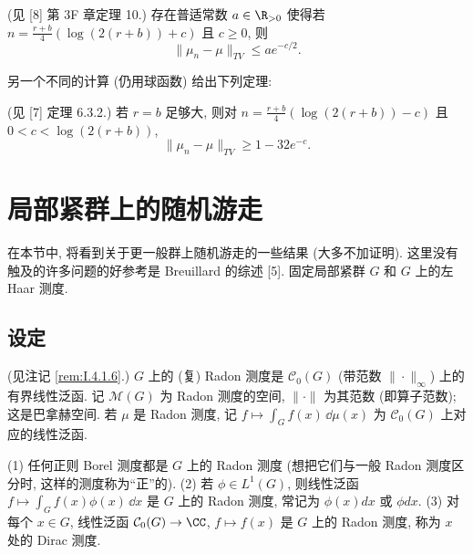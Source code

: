 \begin{theorem}
\label{thm:VI.5.1}
(见 {[}8{]} 第 3F 章定理 10.) 存在普适常数 $a \in \R_{>0}$ 使得若 $n = \frac{r+b}{4}(\log(2(r+b)) + c)$ 且 $c \geq 0$, 则
\[
\|\mu_n - \mu\|_{TV} \leq ae^{-c/2}.
\]
\end{theorem}

另一个不同的计算 (仍用球函数) 给出下列定理:

\begin{theorem}
\label{thm:VI.5.2}
(见 {[}7{]} 定理 6.3.2.) 若 $r = b$ 足够大, 则对 $n = \frac{r+b}{4}(\log(2(r+b)) - c)$ 且 $0 < c < \log(2(r+b))$,
\[
\|\mu_n - \mu\|_{TV} \geq 1 - 32e^{-c}.
\]
\end{theorem}

\section{局部紧群上的随机游走}
在本节中, 将看到关于更一般群上随机游走的一些结果 (大多不加证明). 这里没有触及的许多问题的好参考是 Breuillard 的综述 {[}5{]}.
固定局部紧群 $G$ 和 $G$ 上的左 Haar 测度.

\subsection{设定}

\begin{definition}
\label{def:VI.6.1.1}
(见注记 \ref{rem:I.4.1.6}.) $G$ 上的 (复) Radon 测度是 $\mathcal{C}_0(G)$ (带范数 $\|\cdot\|_{\infty}$) 上的有界线性泛函. 记 $\mathcal{M}(G)$ 为 Radon 测度的空间, $\|\cdot\|$ 为其范数 (即算子范数); 这是巴拿赫空间. 若 $\mu$ 是 Radon 测度, 记 $f \longmapsto \int_G f(x)\,\dd\mu(x)$ 为 $\mathcal{C}_0(G)$ 上对应的线性泛函.
\end{definition}

\begin{example}
\label{exa:VI.6.1.2}
(1) 任何正则 Borel 测度都是 $G$ 上的 Radon 测度 (想把它们与一般 Radon 测度区分时, 这样的测度称为``正''的).
(2) 若 $\phi \in L^1(G)$, 则线性泛函 $f \longmapsto \int_G f(x)\phi(x)\,\dd x$ 是 $G$ 上的 Radon 测度, 常记为 $\phi(x)dx$ 或 $\phi dx$.
(3) 对每个 $x \in G$, 线性泛函 $\mathcal{C}_0(G) \to \CC$, $f \longmapsto f(x)$ 是 $G$ 上的 Radon 测度, 称为 $x$ 处的 Dirac 测度.
\end{example}

